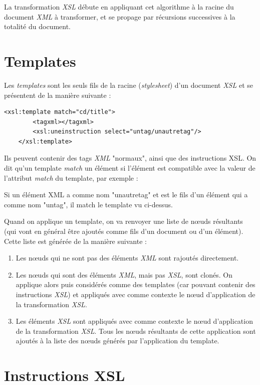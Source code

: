 La transformation \textit{XSL} débute en appliquant cet algorithme à la racine du document \textit{XML} à transformer, et se propage par récursions successives
à la totalité du document.

\section{Templates}

Les \textit{templates} sont les seuls fils de la racine (\textit{stylesheet}) d'un document \textit{XSL} et se présentent de la manière suivante :

\begin{lstlisting}[frame=single]
    <xsl:template match="cd/title">
        <tagxml></tagxml>
        <xsl:uneinstruction select="untag/unautretag"/>
    </xsl:template>
\end{lstlisting}

Ils peuvent contenir des tags \textit{XML} "normaux", ainsi que des instructions XSL.
On dit qu'un template \textit{match} un élément si l'élément est compatible avec la valeur de l'attribut \textit{match} du template, par exemple :

Si un élément XML a comme nom "unautretag" et est le fils d'un élément qui a comme nom "untag", il match le template vu ci-dessus.

Quand on applique un template, on va renvoyer une liste de nœuds résultants (qui vont en général être ajoutés comme fils d'un document ou d'un élément). Cette liste est générée de la manière suivante :\\

\begin{enumerate}
    \item Les nœuds qui ne sont pas des éléments \textit{XML} sont rajoutés directement.
    \item Les nœuds qui sont des éléments \textit{XML}, mais pas \textit{XSL}, sont clonés. On applique alors  puis considérés comme des templates (car pouvant contenir des instructions \textit{XSL}) et appliqués avec comme contexte le nœud d'application de la transformation \textit{XSL}.
    \item Les éléments \textit{XSL} sont appliqués avec comme contexte le nœud d'application de la transformation \textit{XSL}. Tous les nœuds résultants de cette application sont ajoutés à la liste des nœuds générés par l'application du template.
\end{enumerate}

\section{Instructions XSL}

